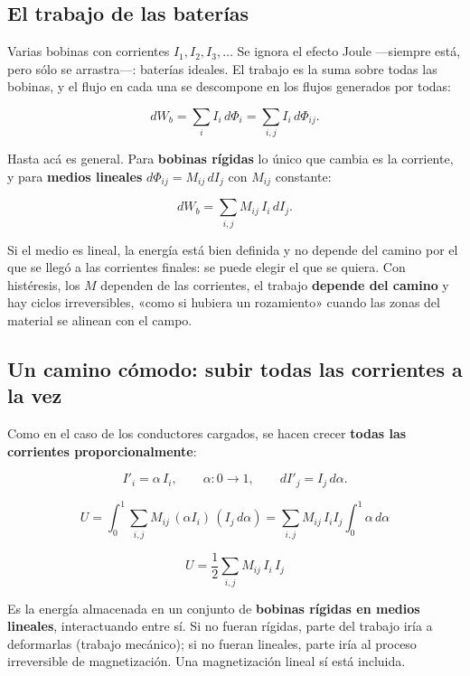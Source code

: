 \documentclass[12pt,a4paper]{article}
\begin{document}
\subsection{El trabajo de las baterías}

Varias bobinas con corrientes $I_1, I_2, I_3,\dots$ Se ignora el efecto Joule
---siempre está, pero sólo se arrastra---: baterías ideales. El trabajo es la suma
sobre todas las bobinas, y el flujo en cada una se descompone en los flujos
generados por todas:

\[
dW_b = \sum_i I_i\,d\Phi_i = \sum_{i,j} I_i\,d\Phi_{ij}.
\]

Hasta acá es general. Para \textbf{bobinas rígidas} lo único que cambia es la
corriente, y para \textbf{medios lineales} $d\Phi_{ij} = M_{ij}\,dI_j$ con $M_{ij}$
constante:

\[
dW_b = \sum_{i,j} M_{ij}\,I_i\,dI_j .
\]

\begin{notebox}
Si el medio es lineal, la energía está
bien definida y no depende del camino por el que se llegó a las corrientes
finales: se puede elegir el que se quiera. Con histéresis, los $M$ dependen
de las corrientes, el trabajo \textbf{depende del camino} y hay ciclos
irreversibles, «como si hubiera un rozamiento» cuando las zonas del material
se alinean con el campo.
\end{notebox}

\subsection{Un camino cómodo: subir todas las corrientes a la vez}

Como en el caso de los conductores cargados, se hacen crecer \textbf{todas las
corrientes proporcionalmente}:

\[
I'_i = \alpha\,I_i,\qquad \alpha: 0\to1,\qquad dI'_j = I_j\,d\alpha .
\]

\[
U = \int_0^1 \sum_{i,j} M_{ij}\,(\alpha I_i)\,(I_j\,d\alpha)
= \sum_{i,j} M_{ij}\,I_i I_j\int_0^1\alpha\,d\alpha
\]

\begin{keybox}
\[
\boxed{\ U = \frac12\sum_{i,j} M_{ij}\,I_i\,I_j\ }
\]
\end{keybox}

Es la energía almacenada en un conjunto de \textbf{bobinas rígidas en medios
lineales}, interactuando entre sí. Si no fueran rígidas, parte del trabajo iría
a deformarlas (trabajo mecánico); si no fueran lineales, parte iría al proceso
irreversible de magnetización. Una magnetización lineal sí está incluida.
\end{document}
